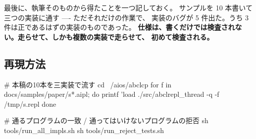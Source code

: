 \documentclass[11pt,a4paper]{ltjsarticle}
\theoremstyle{definition}
\theoremstyle{remark}
\begin{document}
最後に、執筆そのものから得たことを一つ記しておく。
サンプルを 10 本書いて三つの実装に通す ---- ただそれだけの作業で、
実装のバグが 5 件出た。うち 3 件は正であるはずの実装のものであった。
\textbf{仕様は、書くだけでは検査されない。走らせて、しかも複数の実装で走らせて、
初めて検査される。}

\subsection*{再現方法}

\begin{term}
# 本稿の10本を三実装で流す
cd ~/aios/abclcp
for f in docs/samples/paper/s*.aipl; do
  printf 'load %
  ./src/abclrepl_thread -q -f /tmp/s.repl
done

# 通るプログラムの一致 / 通ってはいけないプログラムの拒否
sh tools/run_all_impls.sh
sh tools/run_reject_tests.sh
\end{term}
\end{document}
